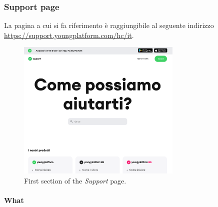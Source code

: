 \subsubsection{Support page}

La pagina a cui si fa riferimento è raggiungibile al seguente indirizzo \\
\href{https://support.youngplatform.com/hc/it}{https://support.youngplatform.com/hc/it}.

\begin{figure}[H]
  \centering
  \includegraphics[width=0.70\textwidth]{res/images/internal-pages/support/support-1.png}
  \caption{First section of the \textit{Support} page.}
  \label{fig:support-1}
\end{figure}

\paragraph{What}

